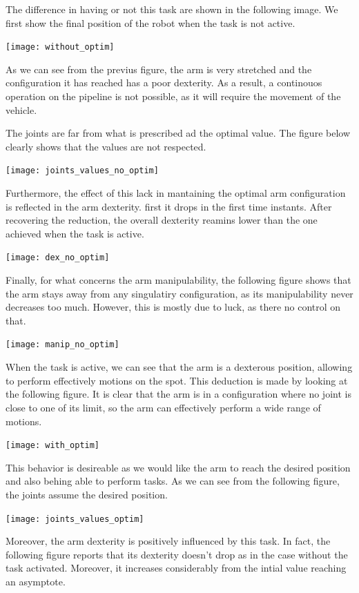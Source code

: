 \documentclass{article}
\begin{document}
The difference in having or not this task are shown in the following image. We first show the final position of the robot when the task is not active. 

\texttt{[image: without\_optim]}


As we can see from the previus figure, the arm is very stretched and the configuration it has reached has a poor dexterity. As a result, a continouos operation on the pipeline is not possible, as it will require the movement of the vehicle. 

The joints are far from what is prescribed ad the optimal value. The figure below clearly shows that the values are not respected. 

\texttt{[image: joints\_values\_no\_optim]}

Furthermore, the effect of this lack in mantaining the optimal arm configuration is reflected in the arm dexterity. first it drops in the first time instants. After recovering the reduction, the overall dexterity reamins lower than the one achieved when the task is active. 

\texttt{[image: dex\_no\_optim]}

Finally, for what concerns the arm manipulability, the following figure shows that the arm stays away from any singulatiry configuration, as its manipulability never decreases too much. However, this is mostly due to luck, as there no control on that. 

\texttt{[image: manip\_no\_optim]}

When the task is active, we can see that the arm is a dexterous position, allowing to perform effectively motions on the spot. This deduction is made by looking at the following figure. It is clear that the arm is in a configuration where no joint is close to one of its limit, so the arm can effectively perform a wide range of motions.

\texttt{[image: with\_optim]}
\centering 

This behavior is desireable as we would like the arm to reach the desired position and also behing able to perform tasks. As we can see from the following figure, the joints assume the desired position.

\texttt{[image: joints\_values\_optim]}

Moreover, the arm dexterity is positively influenced by this task. In fact, the following figure reports that its dexterity doesn't drop as in the case without the task activated. Moreover, it increases considerably from the intial value reaching an asymptote.
\end{document}
